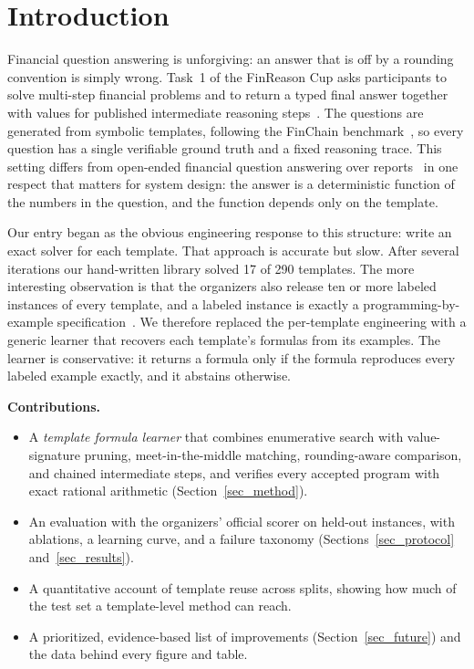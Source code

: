 \documentclass[conference]{IEEEtran}
\begin{document}
\section{Introduction}
Financial question answering is unforgiving: an answer that is off by a
rounding convention is simply wrong. Task~1 of the FinReason Cup asks
participants to solve multi-step financial problems and to return a typed final
answer together with values for published intermediate reasoning
steps~\cite{finreason2026overview,finreason2026task1overview}. The questions are
generated from symbolic templates, following the FinChain
benchmark~\cite{xie-etal-2026-finchain}, so every question has a single
verifiable ground truth and a fixed reasoning trace. This setting differs from
open-ended financial question answering over reports~\cite{chen-etal-2021-finqa}
in one respect that matters for system design: the answer is a deterministic
function of the numbers in the question, and the function depends only on the
template.

Our entry began as the obvious engineering response to this structure: write an
exact solver for each template. That approach is accurate but slow. After
several iterations our hand-written library solved 17 of 290 templates. The
more interesting observation is that the organizers also release ten or more
labeled instances of every template, and a labeled instance is exactly a
programming-by-example specification~\cite{gulwani2017program}. We therefore
replaced the per-template engineering with a generic learner that recovers each
template's formulas from its examples. The learner is conservative: it returns a
formula only if the formula reproduces every labeled example exactly, and it
abstains otherwise.

\textbf{Contributions.}
\begin{itemize}
  \item A \emph{template formula learner} that combines enumerative search with
        value-signature pruning, meet-in-the-middle matching, rounding-aware
        comparison, and chained intermediate steps, and verifies every
        accepted program with exact rational arithmetic (Section~\ref{sec_method}).
  \item An evaluation with the organizers' official scorer on held-out
        instances, with ablations, a learning curve, and a failure taxonomy
        (Sections~\ref{sec_protocol} and~\ref{sec_results}).
  \item A quantitative account of template reuse across splits, showing how
        much of the test set a template-level method can reach.
  \item A prioritized, evidence-based list of improvements
        (Section~\ref{sec_future}) and the data behind every figure and table.
\end{itemize}
\end{document}
